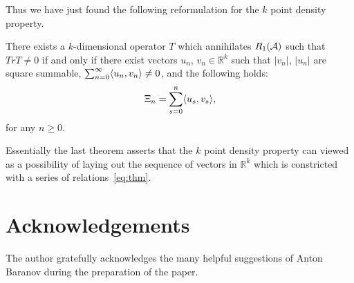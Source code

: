 \documentclass[12pt]{amsart}
\theoremstyle{case}
\begin{document}
  Thus we have just found the following reformulation for the $k$ point density property.
  \begin{prop}
    \label{prop:kreformulation}
    There exists a $k$-dimensional operator $T$ which annihilates $R_1(\cal{A})$
      such that $Tr T \neq 0$ if and only if
      there exist vectors $u_n$, $v_n \in \mathbb{R}^k$ such that
      $\lvert v_n \rvert$, $\lvert u_n \rvert$ are square summable,
      $\sum_{n=0}^\infty \inner{u_n}{v_n} \neq 0$, and the following holds:
      \begin{equation}
        \label{eq:thm}
        \Xi_n = \sum_{s=0}^n \inner{u_s}{v_s},
      \end{equation}
      for any $n \geq 0$.
  \end{prop}
  Essentially the last theorem asserts that the $k$ point density property can viewed as a
    possibility of laying out the sequence of vectors in $\mathbb{R}^k$ which is constricted with
    a series of relations~\eqref{eq:thm}.



\section{Acknowledgements}
  The author gratefully acknowledges the many helpful suggestions of Anton Baranov during the preparation of the paper.


\end{document}

